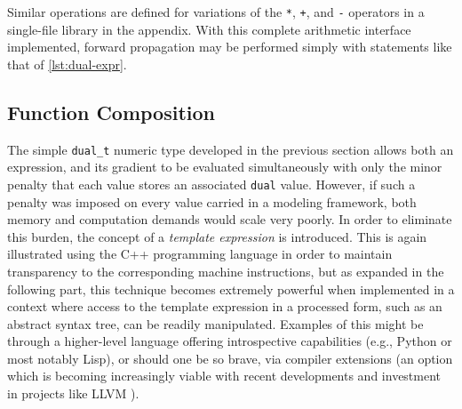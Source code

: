 Similar operations are defined for variations of the \texttt{*},
\texttt{+}, and \texttt{-} operators in a single-file library in the
appendix. With this complete arithmetic interface implemented, forward
propagation may be performed simply with statements like that of
\cref{lst:dual-expr}.

\hypertarget{lst:dual-expr}{%
\label{lst:dual-expr}}%
\begin{Shaded}
\begin{Highlighting}[]
\OperatorTok{(}\OperatorTok{,}  \OperatorTok{**}\OperatorTok{)\{}
  \OperatorTok{(}\OperatorTok{,}\OperatorTok{);}
  \OperatorTok{=}\OperatorTok{*}\OperatorTok{+} \OperatorTok{(}\OperatorTok{{-}}\OperatorTok{)} \OperatorTok{*}\OperatorTok{;}
\OperatorTok{(}\OperatorTok{);}
\OperatorTok{\}}
\end{Highlighting}
\end{Shaded}

\hypertarget{template-expressions}{%
\subsection{Function Composition}\label{template-expressions}}

The simple \texttt{dual\_t} numeric type developed in the previous
section allows both an expression, and its gradient to be evaluated
simultaneously with only the minor penalty that each value stores an
associated \texttt{dual} value. However, if such a penalty was imposed
on every value carried in a modeling framework, both memory and
computation demands would scale very poorly. In order to eliminate this
burden, the concept of a \emph{template expression} is introduced. This
is again illustrated using the C++ programming language in order to
maintain transparency to the corresponding machine instructions, but as
expanded in the following part, this technique becomes extremely
powerful when implemented in a context where access to the template
expression in a processed form, such as an abstract syntax tree, can be
readily manipulated. Examples of this might be through a higher-level
language offering introspective capabilities (e.g., Python or most
notably Lisp), or should one be so brave, via compiler extensions (an
option which is becoming increasingly viable with recent developments
and investment in projects like LLVM \autocite{lattner2004llvm}).

